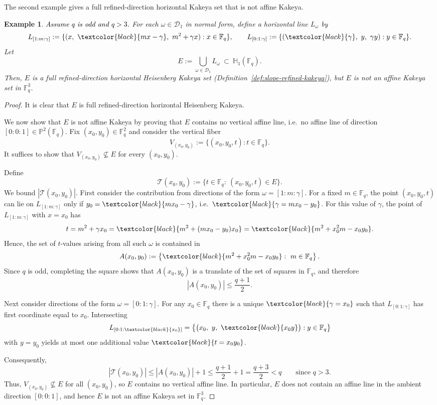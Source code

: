 \documentclass[11pt]{article}
\newtheorem{example}{Example}[section]
\newcommand{\1}{\mathbf 1}
\begin{document}
The second example gives a full refined-direction horizontal Kakeya set that is not affine Kakeya.

\begin{example}
\label{ex:refined-not-affine}
\textcolor{black}{Assume $q$ is odd and $q>3$.}  For each $\omega\in\mathcal{D}_1$ in normal form, define a horizontal line $L_\omega$ by
\[
L_{[1:m:\gamma]}:=\{(x,\ \textcolor{black}{mx-\gamma},\ m^2+\gamma x): x\in\mathbb{F}_q\},
\qquad
L_{[0:1:\gamma]}:=\{(\textcolor{black}{\gamma},\ y,\ \gamma y): y\in\mathbb{F}_q\}.
\]
Let
\[
E:=\bigcup_{\omega\in\mathcal{D}_1} L_\omega\ \subset\ \mathbb{H}_1(\mathbb{F}_q).
\]
Then, $E$ is a full refined-direction horizontal Heisenberg Kakeya set (Definition~\ref{def:slope-refined-kakeya}),
but $E$ is not an affine Kakeya set in $\mathbb{F}_q^3$.
\end{example}

\begin{proof}
It is clear that $E$ is full refined-direction horizontal Heisenberg Kakeya.

We now show that $E$ is not affine Kakeya by proving that $E$ contains no vertical affine line, i.e.\
no affine line of direction $[0:0:1]\in\mathbb{P}^2(\mathbb{F}_q)$.  Fix $(x_0,y_0)\in\mathbb{F}_q^2$
and consider the vertical fiber
\[
V_{(x_0,y_0)}:=\{(x_0,y_0,t): t\in\mathbb{F}_q\}.
\]
It suffices to show that $V_{(x_0,y_0)}\nsubseteq E$ for every $(x_0,y_0)$.

Define
\[
\mathcal T(x_0,y_0):=\{t\in\mathbb{F}_q:\ (x_0,y_0,t)\in E\}.
\]
We bound $|\mathcal T(x_0,y_0)|$.  First consider the contribution from directions of the form $\omega=[1:m:\gamma]$.
For a fixed $m\in\mathbb{F}_q$, the point $(x_0,y_0,t)$ can lie on $L_{[1:m:\gamma]}$ only if
$y_0=\textcolor{black}{mx_0-\gamma}$, i.e.\ $\textcolor{black}{\gamma=mx_0-y_0}$.  For this value of $\gamma$, the point of
$L_{[1:m:\gamma]}$ with $x=x_0$ has
\[
t=m^2+\gamma x_0
=
\textcolor{black}{m^2+(mx_0-y_0)x_0}
=
\textcolor{black}{m^2+x_0^2 m-x_0y_0}.
\]
Hence, the set of $t$-values arising from all such $\omega$ is contained in
\[
A(x_0,y_0):=
\left\{\textcolor{black}{m^2+x_0^2 m-x_0y_0}:\ m\in\mathbb{F}_q\right\}.
\]
Since $q$ is odd, completing the square shows that $A(x_0,y_0)$ is a translate of the set of squares
in $\mathbb{F}_q$, and therefore
\[
|A(x_0,y_0)|\le \frac{q+1}{2}.
\]

Next consider directions of the form $\omega=[0:1:\gamma]$.  For any $x_0\in\mathbb{F}_q$ there is a
unique $\textcolor{black}{\gamma=x_0}$ such that $L_{[0:1:\gamma]}$ has first coordinate equal to $x_0$.  Intersecting
\[
L_{[0:1:\textcolor{black}{x_0}]}=\big\{ \big(x_0,\ y,\ \textcolor{black}{x_0 y} \big): y\in\mathbb{F}_q \big\}
\]
with $y=y_0$ yields at most one additional value $\textcolor{black}{t= x_0 y_0}$.

Consequently,
\[
|\mathcal T(x_0,y_0)|
\le
|A(x_0,y_0)|+1
\le
\frac{q+1}{2}+1
=
\frac{q+3}{2}
<
q
\qquad\text{since }q>3.
\]
Thus, $V_{(x_0,y_0)}\nsubseteq E$ for all $(x_0,y_0)$, so $E$ contains no vertical affine line.
In particular, $E$ does not contain an affine line in the ambient direction $[0:0:1]$, and hence $E$
is not an affine Kakeya set in $\mathbb{F}_q^3$.
\end{proof}
\end{document}
